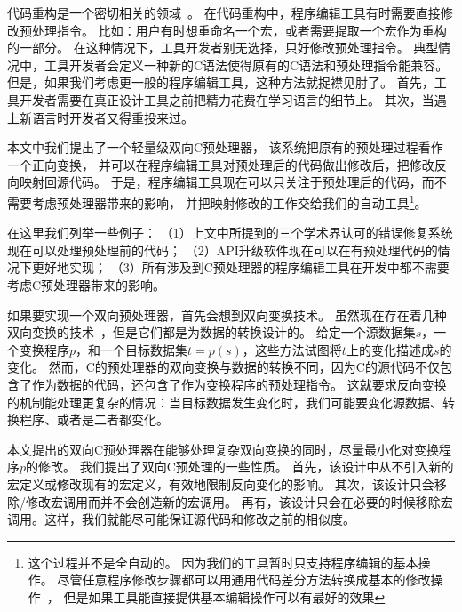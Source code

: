 代码重构是一个密切相关的领域~\parencite{McCloskey:2005,Garrido2013}。
在代码重构中，程序编辑工具有时需要直接修改预处理指令。
比如：用户有时想重命名一个宏，或者需要提取一个宏作为重构的一部分。
在这种情况下，工具开发者别无选择，只好修改预处理指令。
典型情况中，工具开发者会定义一种新的C语法使得原有的C语法和预处理指令能兼容。
但是，如果我们考虑更一般的程序编辑工具，这种方法就捉襟见肘了。
首先，工具开发者需要在真正设计工具之前把精力花费在学习语言的细节上。
其次，当遇上新语言时开发者又得重投来过。

本文中我们提出了一个轻量级双向C预处理器，
该系统把原有的预处理过程看作一个正向变换，
并可以在程序编辑工具对预处理后的代码做出修改后，把修改反向映射回源代码。
于是，程序编辑工具现在可以只关注于预处理后的代码，而不需要考虑预处理器带来的影响，
并把映射修改的工作交给我们的自动工具\footnote{这个过程并不是全自动的。
因为我们的工具暂时只支持程序编辑的基本操作。
尽管任意程序修改步骤都可以用通用代码差分方法转换成基本的修改操作~\parencite{fluri2007change}，
但是如果工具能直接提供基本编辑操作可以有最好的效果}。




在这里我们列举一些例子：
（1）上文中所提到的三个学术界认可的错误修复系统现在可以处理预处理前的代码；
（2）API升级软件现在可以在有预处理代码的情况下更好地实现；
（3）所有涉及到C预处理器的程序编辑工具在开发中都不需要考虑C预处理器带来的影响。


如果要实现一个双向预处理器，首先会想到双向变换技术。
虽然现在存在着几种双向变换的技术~\parencite{MaHNHT07,Voigtlander09bff,voigtlander2010combining}，但是它们都是为数据的转换设计的。
给定一个源数据集$s$，一个变换程序$p$，和一个目标数据集$t=p(s)$，这些方法试图将$t$上的变化描述成$s$的变化。
然而，C的预处理器的双向变换与数据的转换不同，因为C的源代码不仅包含了作为数据的代码，还包含了作为变换程序的预处理指令。
这就要求反向变换的机制能处理更复杂的情况：当目标数据发生变化时，我们可能要变化源数据、转换程序、或者是二者都变化。


本文提出的双向C预处理器在能够处理复杂双向变换的同时，尽量最小化对变换程序$p$的修改。
我们提出了双向C预处理的一些性质。
首先，该设计中从不引入新的宏定义或修改现有的宏定义，有效地限制反向变化的影响。
其次，该设计只会移除/修改宏调用而并不会创造新的宏调用。
再有，该设计只会在必要的时候移除宏调用。这样，我们就能尽可能保证源代码和修改之前的相似度。


